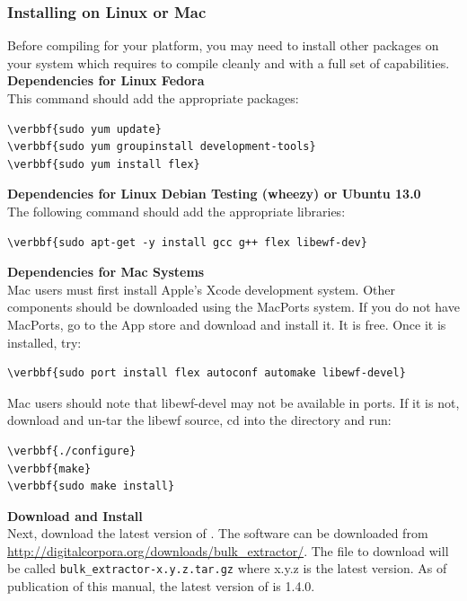 \documentclass[11pt]{article} %
\begin{document}
\subsubsection{Installing on Linux or Mac}
\label{InstallOnLinuxMac}
Before compiling \bulk for your platform, you may need to install other packages on your system which \bulk requires to compile cleanly and with a full set of capabilities.\\

\textbf{Dependencies for Linux Fedora}\\
This command should add the appropriate packages:
\begin{Verbatim}[commandchars=\\\{\}]
\verbbf{sudo yum update}
\verbbf{sudo yum groupinstall development-tools}
\verbbf{sudo yum install flex}
\end{Verbatim}

\textbf{Dependencies for Linux Debian Testing (wheezy) or Ubuntu 13.0}\\
The following command should add the appropriate libraries:
\begin{Verbatim}[commandchars=\\\{\}]
\verbbf{sudo apt-get -y install gcc g++ flex libewf-dev} 
\end{Verbatim}

\textbf{Dependencies for Mac Systems}\\
Mac users must first install Apple's Xcode development system. Other components should be downloaded using the MacPorts system. If you do not have MacPorts, go to the App store and download and install it. It is free. Once it is installed, try:
\begin{Verbatim}[commandchars=\\\{\}]
\verbbf{sudo port install flex autoconf automake libewf-devel}
\end{Verbatim}

Mac users should note that libewf-devel may not be available in ports.  If it is not, download and un-tar the libewf source, cd into the directory and run:
\begin{Verbatim}[commandchars=\\\{\}]
\verbbf{./configure} 
\verbbf{make}
\verbbf{sudo make install}
\end{Verbatim}

\textbf{Download and Install \bulk}\\
Next, download the latest version of \bulk. The software can be downloaded from \url{http://digitalcorpora.org/downloads/bulk_extractor/}. The file to download will be called \texttt{bulk\_extractor-x.y.z.tar.gz} where x.y.z is the latest version. As of publication of this manual, the latest version of \bulk is 1.4.0. \\
\end{document}
